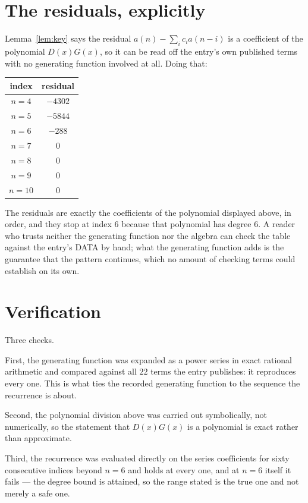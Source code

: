 \documentclass[11pt,a4paper]{article}
\theoremstyle{plain}
\theoremstyle{definition}
\begin{document}
\section{The residuals, explicitly}

Lemma~\ref{lem:key} says the residual $a(n)-\sum_ic_ia(n-i)$ is a coefficient of the
polynomial $D(x)G(x)$, so it can be read off the entry's own published terms with no
generating function involved at all. Doing that:
\begin{center}
\begin{tabular}{cc}
index & residual \\ \hline
$n=4$ & $-4302$ \\
$n=5$ & $-5844$ \\
$n=6$ & $-288$ \\
$n=7$ & $0$ \\
$n=8$ & $0$ \\
$n=9$ & $0$ \\
$n=10$ & $0$
\end{tabular}
\end{center}
The residuals are exactly the coefficients of the polynomial displayed above, in order, and
they stop at index $6$ because that polynomial has degree $6$. A reader who trusts
neither the generating function nor the algebra can check the table against the entry's DATA
by hand; what the generating function adds is the guarantee that the pattern continues, which
no amount of checking terms could establish on its own.

\section{Verification}

Three checks.

First, the generating function was expanded as a power series in exact rational arithmetic and
compared against all $22$ terms the entry publishes: it reproduces every one. This is
what ties the recorded generating function to the sequence the recurrence is about.

Second, the polynomial division above was carried out symbolically, not numerically, so the
statement that $D(x)G(x)$ is a polynomial is exact rather than approximate.

Third, the recurrence was evaluated directly on the series coefficients for sixty consecutive
indices beyond $n=6$ and holds at every one, and at $n=6$ itself it fails --- the
degree bound is attained, so the range stated is the true one and not merely a safe one.
\end{document}
